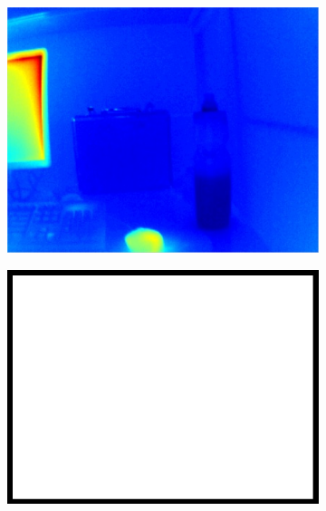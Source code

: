 \begin{figure}
\centering
	\begin{subfigure}{0.49\columnwidth}
    \centering
    \includegraphics[width=1.00\textwidth]{media/V_C_highsnr.jpg}
	    \caption{}
		\label{fig:imgprocessing_1}
  \end{subfigure}
	\begin{subfigure}{0.49\columnwidth}
    \centering
    \includegraphics[width=1.00\textwidth]{media/dummy.jpg}
		\caption{}
		\label{fig:imgprocessing_2}
  \end{subfigure} \vspace{10pt} \\ 
	\begin{subfigure}{0.49\columnwidth}

\end{subfigure}
\end{figure}
